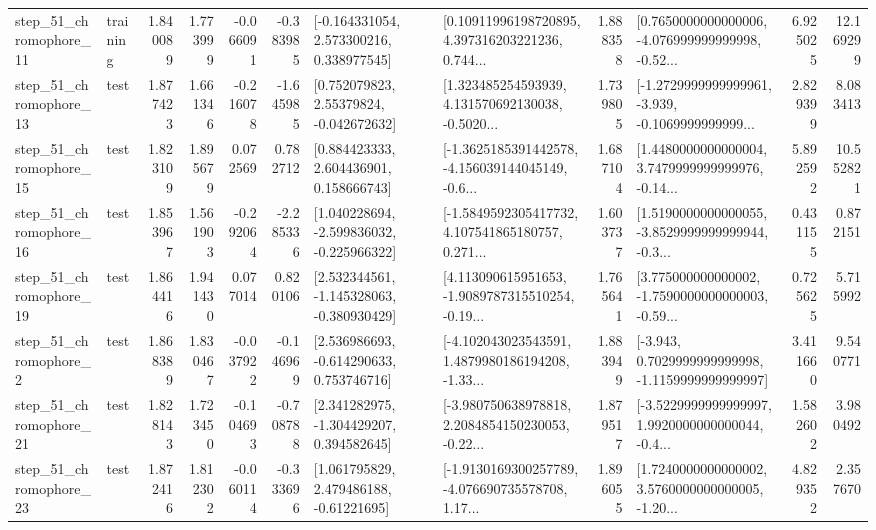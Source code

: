 \begin{tabular}{llrrrrllrlrr}
   step\_51\_chromophore\_11 &  training &      1.840089 &    1.773999 &     -0.066091 & -0.383985 &    [-0.164331054, 2.573300216, 0.338977545] &  [0.10911996198720895, 4.397316203221236, 0.744... &       1.888358 &  [0.7650000000000006, -4.076999999999998, -0.52... &            6.925025 &         12.169299 \\
   step\_51\_chromophore\_13 &      test &      1.877423 &    1.661346 &     -0.216078 & -1.645985 &     [0.752079823, 2.55379824, -0.042672632] &  [1.323485254593939, 4.131570692130038, -0.5020... &       1.739805 &  [-1.2729999999999961, -3.939, -0.1069999999999... &            2.829399 &          8.083413 \\
   step\_51\_chromophore\_15 &      test &      1.823109 &    1.895679 &      0.072569 &  0.782712 &     [0.884423333, 2.604436901, 0.158666743] &  [-1.3625185391442578, -4.156039144045149, -0.6... &       1.687104 &  [1.4480000000000004, 3.7479999999999976, -0.14... &            5.892592 &         10.552821 \\
   step\_51\_chromophore\_16 &      test &      1.853967 &    1.561903 &     -0.292064 & -2.285336 &   [1.040228694, -2.599836032, -0.225966322] &  [-1.5849592305417732, 4.107541865180757, 0.271... &       1.603737 &  [1.5190000000000055, -3.8529999999999944, -0.3... &            0.431155 &          0.872151 \\
   step\_51\_chromophore\_19 &      test &      1.864416 &    1.941430 &      0.077014 &  0.820106 &   [2.532344561, -1.145328063, -0.380930429] &  [4.113090615951653, -1.9089787315510254, -0.19... &       1.765641 &  [3.775000000000002, -1.7590000000000003, -0.59... &            0.725625 &          5.715992 \\
    step\_51\_chromophore\_2 &      test &      1.868389 &    1.830467 &     -0.037922 & -0.146969 &    [2.536986693, -0.614290633, 0.753746716] &  [-4.102043023543591, 1.4879980186194208, -1.33... &       1.883949 &  [-3.943, 0.7029999999999998, -1.1159999999999997] &            3.411660 &          9.540771 \\
   step\_51\_chromophore\_21 &      test &      1.828143 &    1.723450 &     -0.104693 & -0.708788 &    [2.341282975, -1.304429207, 0.394582645] &  [-3.980750638978818, 2.2084854150230053, -0.22... &       1.879517 &  [-3.5229999999999997, 1.9920000000000044, -0.4... &            1.582602 &          3.980492 \\
   step\_51\_chromophore\_23 &      test &      1.872416 &    1.812302 &     -0.060114 & -0.333696 &     [1.061795829, 2.479486188, -0.61221695] &  [-1.9130169300257789, -4.076690735578708, 1.17... &       1.896055 &  [1.7240000000000002, 3.5760000000000005, -1.20... &            4.829352 &          2.357670 \\

\end{tabular}
